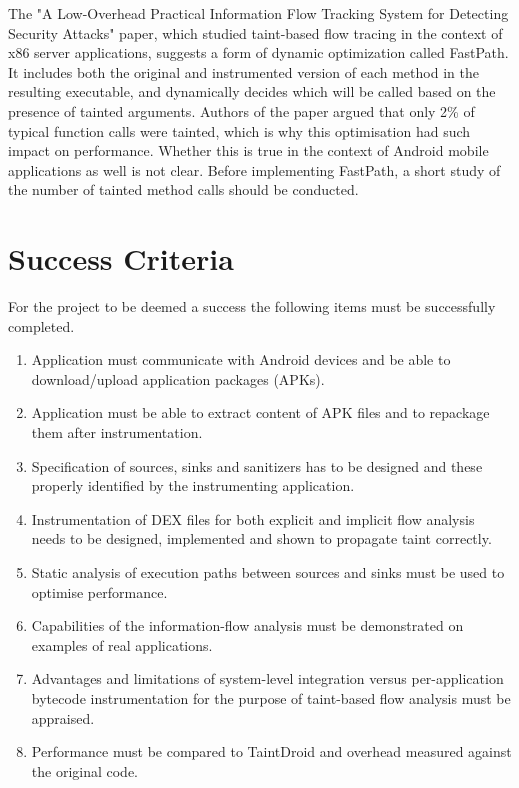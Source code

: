 \documentclass[12pt]{article}
\begin{document}
The "A Low-Overhead Practical Information Flow Tracking System for 
Detecting Security Attacks" paper, which studied taint-based flow tracing 
in the context of x86 server applications, suggests a form of dynamic 
optimization called FastPath. It includes both the original and 
instrumented version of each method in the resulting executable, and
dynamically decides which will be called based on the presence of tainted 
arguments. Authors of the paper argued that only 2\% of typical 
function calls were tainted, which is why this optimisation had such  
impact on performance. Whether this is true in the context of Android mobile
applications as well is not clear. Before implementing FastPath, a short 
study of the number of tainted method calls should be conducted.

\section*{Success Criteria}

For the project to be deemed a success the following items must be
successfully completed.

\begin{enumerate}

\item Application must communicate with Android devices and be able to
      download/upload application packages (APKs).

\item Application must be able to extract content of APK files
      and to repackage them after instrumentation.

\item Specification of sources, sinks and sanitizers has to be designed
      and these properly identified by the instrumenting application.

\item Instrumentation of DEX files for both explicit and implicit flow 
      analysis needs to be designed, implemented and shown to propagate 
      taint correctly.

\item Static analysis of execution paths between sources and sinks 
      must be used to optimise performance.

\item Capabilities of the information-flow analysis must be demonstrated
      on examples of real applications.
      
\item Advantages and limitations of system-level integration versus 
      per-application bytecode instrumentation for the purpose of 
      taint-based flow analysis must be appraised.

\item Performance must be compared to TaintDroid and overhead measured
      against the original code.

\end{enumerate}
\end{document}
